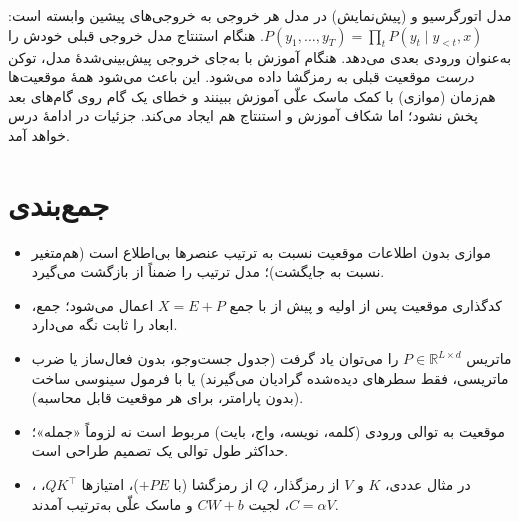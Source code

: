 \begin{addedbox}{مدل اتورگرسیو و  (پیش‌نمایش)}
در مدل  هر خروجی به خروجی‌های پیشین وابسته است: $P(y_1,\dots,y_T)=\prod_t P(y_t\mid y_{<t},x)$. هنگام استنتاج مدل خروجی قبلی خودش را به‌عنوان ورودی بعدی می‌دهد. هنگام آموزش با  به‌جای خروجی پیش‌بینی‌شدهٔ مدل، توکن \emph{درست} موقعیت قبلی به رمزگشا داده می‌شود. این باعث می‌شود همهٔ موقعیت‌ها هم‌زمان (موازی) با کمک ماسک علّی آموزش ببینند و خطای یک گام روی گام‌های بعد پخش نشود؛ اما شکاف آموزش و استنتاج هم ایجاد می‌کند. جزئیات در ادامهٔ درس خواهد آمد.
\end{addedbox}

\section{جمع‌بندی}
\begin{itemize}
  \item {} موازی بدون اطلاعات موقعیت نسبت به ترتیب عنصرها بی‌اطلاع است (هم‌متغیر نسبت به جایگشت)؛ مدل  ترتیب را ضمناً از بازگشت می‌گیرد.
  \item کدگذاری موقعیت پس از  اولیه و پیش از  با جمع $X=E+P$ اعمال می‌شود؛ جمع، ابعاد را ثابت نگه می‌دارد.
  \item ماتریس $P\in\mathbb{R}^{L\times d}$ را می‌توان یاد گرفت (جدول جست‌وجو، بدون فعال‌ساز یا ضرب ماتریسی، فقط سطرهای دیده‌شده گرادیان می‌گیرند) یا با فرمول سینوسی ساخت (بدون پارامتر، برای هر موقعیت قابل محاسبه).
  \item موقعیت به توالی ورودی (کلمه، نویسه، واج، بایت) مربوط است نه لزوماً «جمله»؛ حداکثر طول توالی یک تصمیم طراحی است.
  \item در مثال عددی، $K$ و $V$ از رمزگذار، $Q$ از رمزگشا (با $+PE$)، امتیازها $QK^\top$، ، $C=\alpha V$، لجیت $CW+b$ و ماسک علّی به‌ترتیب آمدند.
\end{itemize}

